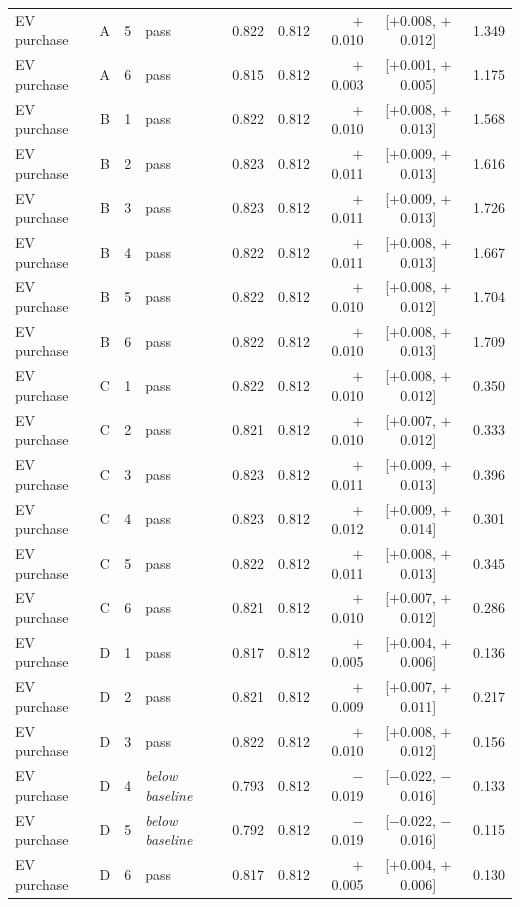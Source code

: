 {\begin{longtable}{lccl rrrcr}
EV purchase & A & 5 & pass & 0.822 & 0.812 & $+$0.010 & [$+$0.008, $+$0.012] & 1.349 \\
EV purchase & A & 6 & pass & 0.815 & 0.812 & $+$0.003 & [$+$0.001, $+$0.005] & 1.175 \\
\addlinespace[2pt]
EV purchase & B & 1 & pass & 0.822 & 0.812 & $+$0.010 & [$+$0.008, $+$0.013] & 1.568 \\
EV purchase & B & 2 & pass & 0.823 & 0.812 & $+$0.011 & [$+$0.009, $+$0.013] & 1.616 \\
EV purchase & B & 3 & pass & 0.823 & 0.812 & $+$0.011 & [$+$0.009, $+$0.013] & 1.726 \\
EV purchase & B & 4 & pass & 0.822 & 0.812 & $+$0.011 & [$+$0.008, $+$0.013] & 1.667 \\
EV purchase & B & 5 & pass & 0.822 & 0.812 & $+$0.010 & [$+$0.008, $+$0.012] & 1.704 \\
EV purchase & B & 6 & pass & 0.822 & 0.812 & $+$0.010 & [$+$0.008, $+$0.013] & 1.709 \\
\addlinespace[2pt]
EV purchase & C & 1 & pass & 0.822 & 0.812 & $+$0.010 & [$+$0.008, $+$0.012] & 0.350 \\
EV purchase & C & 2 & pass & 0.821 & 0.812 & $+$0.010 & [$+$0.007, $+$0.012] & 0.333 \\
EV purchase & C & 3 & pass & 0.823 & 0.812 & $+$0.011 & [$+$0.009, $+$0.013] & 0.396 \\
EV purchase & C & 4 & pass & 0.823 & 0.812 & $+$0.012 & [$+$0.009, $+$0.014] & 0.301 \\
EV purchase & C & 5 & pass & 0.822 & 0.812 & $+$0.011 & [$+$0.008, $+$0.013] & 0.345 \\
EV purchase & C & 6 & pass & 0.821 & 0.812 & $+$0.010 & [$+$0.007, $+$0.012] & 0.286 \\
\addlinespace[2pt]
EV purchase & D & 1 & pass & 0.817 & 0.812 & $+$0.005 & [$+$0.004, $+$0.006] & 0.136 \\
EV purchase & D & 2 & pass & 0.821 & 0.812 & $+$0.009 & [$+$0.007, $+$0.011] & 0.217 \\
EV purchase & D & 3 & pass & 0.822 & 0.812 & $+$0.010 & [$+$0.008, $+$0.012] & 0.156 \\
EV purchase & D & 4 & \emph{below baseline} & 0.793 & 0.812 & $-$0.019 & [$-$0.022, $-$0.016] & 0.133 \\
EV purchase & D & 5 & \emph{below baseline} & 0.792 & 0.812 & $-$0.019 & [$-$0.022, $-$0.016] & 0.115 \\
EV purchase & D & 6 & pass & 0.817 & 0.812 & $+$0.005 & [$+$0.004, $+$0.006] & 0.130 \\
\end{longtable}
}

